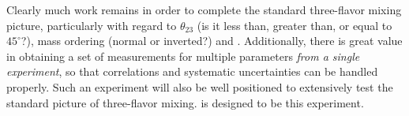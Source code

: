 Clearly much work remains in order to complete the standard three-flavor 
mixing picture, particularly 
with regard to $\theta_{23}$ (is it less than, greater than, or equal
to $45^\circ$?), mass ordering (normal or inverted?) 
and \deltacp.
Additionally, there is 
great value in obtaining a set of measurements for multiple parameters 
\emph{from a single experiment}, so that correlations and systematic 
uncertainties can be handled properly.  Such an experiment will also be 
well positioned to extensively test the standard picture of three-flavor mixing.  
 is designed to be this experiment.